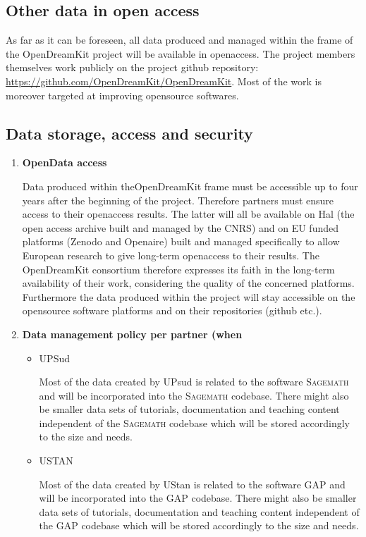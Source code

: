 \documentclass[12pt]{article}
\newcommand{\software}[1]{\textsc{#1}\xspace}
\newcommand{\Sage}{\software{Sagemath}}
\newcommand{\GAP}{\software{GAP}}
\begin{document}
\subsection{Other data in open access}
As far as it can be foreseen, all data produced and managed within the frame of the OpenDreamKit project will be available in openaccess. The project members themselves work publicly on the project github repository: \href{https://github.com/OpenDreamKit/OpenDreamKit}{https://github.com/OpenDreamKit/OpenDreamKit}.
Most of the work is moreover targeted at improving opensource softwares.

\subsection{Data storage, access and security}
\begin{enumerate}
\item\textbf{OpenData access}

Data produced within theOpenDreamKit frame must be accessible up to four years after the beginning of the project. Therefore partners must ensure access to their openaccess results.
The latter will all be available on Hal (the open access archive built and managed by the CNRS) and on EU funded platforms (Zenodo and Openaire) built and managed specifically to allow European research to give long-term openaccess to their results. The OpenDreamKit consortium therefore expresses its faith in the long-term availability of their work, considering the quality of the concerned platforms. Furthermore the data produced within the project will stay accessible on the opensource software platforms and on their repositories (github etc.).

\item\textbf{Data management policy per partner (when}
\begin{itemize}

\item{UPSud}

Most of the data created by UPsud is related to the software \Sage and will be incorporated into the \Sage codebase. There might also be smaller data sets of tutorials, documentation and teaching content independent of the \Sage codebase which will be stored accordingly to the size and needs.

\item{USTAN}

Most of the data created by UStan is related to the software \GAP and
will be incorporated into the \GAP codebase. There might also be
smaller data sets of tutorials, documentation and teaching content
independent of the \GAP codebase which will be stored accordingly to the size and needs.


\end{itemize}
\end{enumerate}
\end{document}
